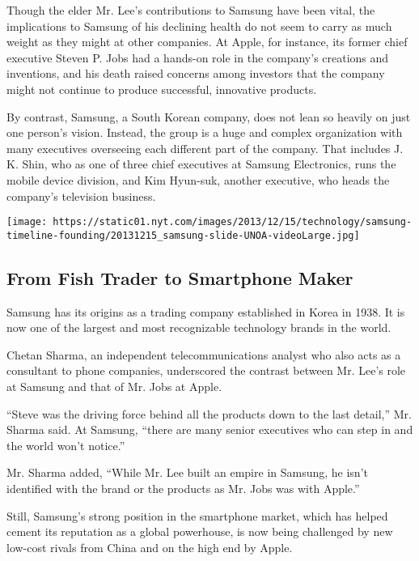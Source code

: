 Though the elder Mr. Lee's contributions to Samsung have been vital, the
implications to Samsung of his declining health do not seem to carry as
much weight as they might at other companies. At Apple, for instance,
its former chief executive Steven P. Jobs had a hands-on role in the
company's creations and inventions, and his death raised concerns among
investors that the company might not continue to produce successful,
innovative products.

By contrast, Samsung, a South Korean company, does not lean so heavily
on just one person's vision. Instead, the group is a huge and complex
organization with many executives overseeing each different part of the
company. That includes J. K. Shin, who as one of three chief executives
at Samsung Electronics, runs the mobile device division, and Kim
Hyun-suk, another executive, who heads the company's television
business.

\href{https://www.nytimes.com/interactive/2013/12/15/technology/samsung-timeline.html}{}

\texttt{[image: https://static01.nyt.com/images/2013/12/15/technology/samsung-timeline-founding/20131215\_samsung-slide-UNOA-videoLarge.jpg]}

\hypertarget{from-fish-trader-to-smartphone-maker}{%
\subsection{From Fish Trader to Smartphone
Maker}\label{from-fish-trader-to-smartphone-maker}}

Samsung has its origins as a trading company established in Korea in
1938. It is now one of the largest and most recognizable technology
brands in the world.

Chetan Sharma, an independent telecommunications analyst who also acts
as a consultant to phone companies, underscored the contrast between Mr.
Lee's role at Samsung and that of Mr. Jobs at Apple.

``Steve was the driving force behind all the products down to the last
detail,'' Mr. Sharma said. At Samsung, ``there are many senior
executives who can step in and the world won't notice.''

Mr. Sharma added, ``While Mr. Lee built an empire in Samsung, he isn't
identified with the brand or the products as Mr. Jobs was with Apple.''

Still, Samsung's strong position in the smartphone market, which has
helped cement its reputation as a global powerhouse, is now being
challenged by new low-cost rivals from China and on the high end by
Apple.

